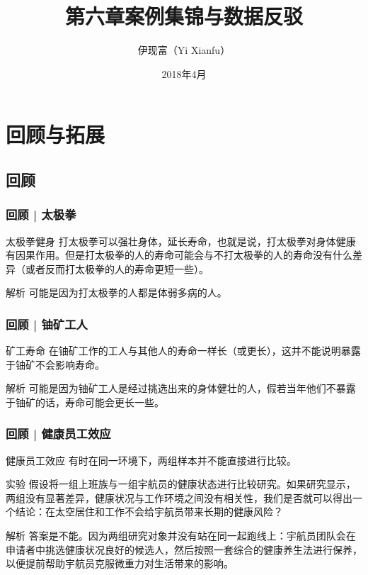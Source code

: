 



\title[案例集锦与数据反驳]{第六章\quad 案例集锦与数据反驳}
\author[Yixf]{伊现富（Yi Xianfu）}
\date{2018年4月}



\section{回顾与拓展}
\subsection{回顾}
\begin{frame}
  \frametitle{回顾 | 太极拳}
  \begin{block}{太极拳健身}
打太极拳可以强壮身体，延长寿命，也就是说，打太极拳对身体健康有因果作用。但是打太极拳的人的寿命可能会与不打太极拳的人的寿命没有什么差异（或者反而打太极拳的人的寿命更短一些）。
  \end{block}
  \pause \pause \pause \pause
  \begin{block}{解析}
    可能是因为打太极拳的人都是体弱多病的人。
  \end{block}
\end{frame}

\begin{frame}
  \frametitle{回顾 | 铀矿工人}
  \begin{block}{矿工寿命}
    在铀矿工作的工人与其他人的寿命一样长（或更长），这并不能说明暴露于铀矿不会影响寿命。
  \end{block}
  \pause \pause \pause \pause
  \begin{block}{解析}
    可能是因为铀矿工人是经过挑选出来的身体健壮的人，假若当年他们不暴露于铀矿的话，寿命可能会更长一些。
  \end{block}
\end{frame}

\begin{frame}
  \frametitle{回顾 | 健康员工效应}
  \begin{block}{健康员工效应}
    有时在同一环境下，两组样本并不能直接进行比较。
  \end{block}
  \pause
  \begin{block}{实验}
假设将一组上班族与一组宇航员的健康状态进行比较研究。如果研究显示，两组没有显著差异，健康状况与工作环境之间没有相关性，我们是否就可以得出一个结论：在太空居住和工作不会给宇航员带来长期的健康风险？
  \end{block}
  \pause \pause \pause \pause
  \begin{block}{解析}
答案是不能。因为两组研究对象并没有站在同一起跑线上：宇航员团队会在申请者中挑选健康状况良好的候选人，然后按照一套综合的健康养生法进行保养，以便提前帮助宇航员克服微重力对生活带来的影响。
  \end{block}
\end{frame}


